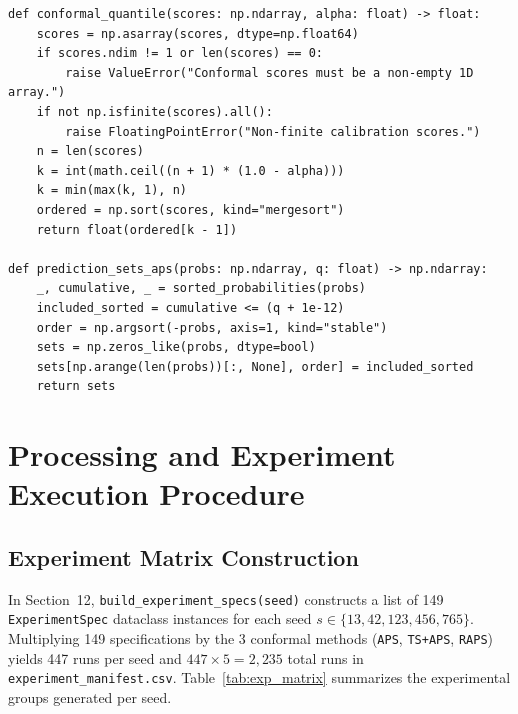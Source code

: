 \documentclass[11pt,a4paper]{article}
\begin{document}
\begin{lstlisting}[caption={Core conformal quantile and deterministic APS/RAPS prediction-set construction in Section~10.}]
def conformal_quantile(scores: np.ndarray, alpha: float) -> float:
    scores = np.asarray(scores, dtype=np.float64)
    if scores.ndim != 1 or len(scores) == 0:
        raise ValueError("Conformal scores must be a non-empty 1D array.")
    if not np.isfinite(scores).all():
        raise FloatingPointError("Non-finite calibration scores.")
    n = len(scores)
    k = int(math.ceil((n + 1) * (1.0 - alpha)))
    k = min(max(k, 1), n)
    ordered = np.sort(scores, kind="mergesort")
    return float(ordered[k - 1])

def prediction_sets_aps(probs: np.ndarray, q: float) -> np.ndarray:
    _, cumulative, _ = sorted_probabilities(probs)
    included_sorted = cumulative <= (q + 1e-12)
    order = np.argsort(-probs, axis=1, kind="stable")
    sets = np.zeros_like(probs, dtype=bool)
    sets[np.arange(len(probs))[:, None], order] = included_sorted
    return sets
\end{lstlisting}

\section{Processing and Experiment Execution Procedure}
\label{sec:procedure}

\subsection{Experiment Matrix Construction}
In Section~12, \texttt{build\_\allowbreak{}experiment\_\allowbreak{}specs(seed)} constructs a list of 149 \texttt{ExperimentSpec} dataclass instances for each seed $s \in \{13, 42, 123, 456, 765\}$. Multiplying 149 specifications by the 3 conformal methods (\texttt{APS}, \texttt{TS+APS}, \texttt{RAPS}) yields 447 runs per seed and $447 \times 5 = 2{,}235$ total runs in \texttt{experiment\_\allowbreak{}manifest.csv}. Table~\ref{tab:exp_matrix} summarizes the experimental groups generated per seed.
\end{document}
